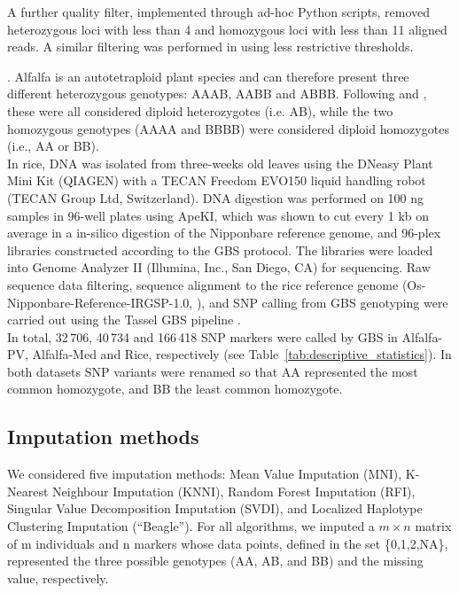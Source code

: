 A further quality filter, implemented through ad-hoc Python scripts, removed heterozygous loci with less than 4 and homozygous loci with less than 11 aligned reads. A similar filtering was performed in \cite{Rocher_validation_2015} using less restrictive thresholds. 


. Alfalfa is an autotetraploid plant species and can therefore present three different heterozygous genotypes: AAAB, AABB and ABBB. Following \cite{li_saturated_2014} and \cite{li_genomic_2015}, these were all considered diploid heterozygotes (i.e. AB), while the two homozygous genotypes (AAAA and BBBB) were considered diploid homozygotes (i.e., AA or BB).\\


In rice, DNA was isolated from three-weeks old leaves using the DNeasy Plant Mini Kit (QIAGEN) with a TECAN Freedom EVO150 liquid handling robot (TECAN Group Ltd, Switzerland). DNA digestion was performed on 100 ng samples in 96-well plates using ApeKI, which was shown to cut every 1 kb on average in a in-silico digestion of the Nipponbare reference genome, and 96-plex libraries constructed according to the GBS protocol. The libraries were loaded into Genome Analyzer II (Illumina, Inc., San Diego, CA) for sequencing. Raw sequence data filtering, sequence alignment to the rice reference genome (Os-Nipponbare-Reference-IRGSP-1.0, \cite{kawahara_improvement_2013}), and SNP calling from GBS genotyping were carried out using the Tassel GBS pipeline \cite{glaubitz_tassel-gbs:_2014}.\\
In total, 32\,706, 40\,734 and 166\,418 SNP markers were called by GBS in Alfalfa-PV, Alfalfa-Med and Rice, respectively (see Table~\ref{tab:descriptive_statistics}). In both datasets SNP variants were renamed so that AA represented the most common homozygote, and BB the least common homozygote.



\subsection{Imputation methods}
\label{sec:imputation_methods}
We considered five imputation methods: Mean Value Imputation (MNI), K-Nearest Neighbour Imputation (KNNI), Random Forest Imputation (RFI), Singular Value Decomposition Imputation (SVDI), and Localized Haplotype Clustering Imputation (``Beagle''). For all algorithms, we imputed a $m\times n$ matrix of m individuals and n markers whose data points, defined in the set \{0,1,2,NA\}, represented the three possible genotypes (AA, AB, and BB) and the missing value, respectively. 
